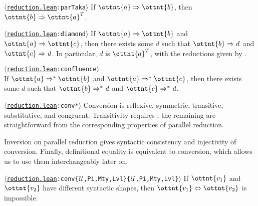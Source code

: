 \documentclass[a4paper,UKenglish,cleveref,autoref,thm-restate]{lipics-v2021}
\newcommand{\repo}{https://github.com/ionathanch/TTBFL}
\newcommand{\thmref}[2]{%
  $\langle$\href{\repo/tree/main/src/#1}{\texttt{#1}}\texttt{:#2}$\rangle$%
}
\begin{document}
\begin{lemma}[Completion (p.r.)] \thmref{reduction.lean}{parTaka} \label{lem:par:compl}
  If $ \ottnt{a}  \Rightarrow  \ottnt{b} $, then $ \ottnt{b}  \Rightarrow   \ottnt{a} ^{ \mathsf{T} }  $.
\end{lemma}

\begin{corollary}[Diamond (p.r.)] \thmref{reduction.lean}{diamond} \label{lem:par:diamond}
  If $ \ottnt{a}  \Rightarrow  \ottnt{b} $ and $ \ottnt{a}  \Rightarrow  \ottnt{c} $,
  then there exists some $d$ such that $ \ottnt{b}  \Rightarrow   \mathit{ d }  $ and $ \ottnt{c}  \Rightarrow   \mathit{ d }  $.
  In particular, $d$ is $ \ottnt{a} ^{ \mathsf{T} } $,
  with the reductions given by .
\end{corollary}

\begin{theorem}[Confluence (p.r.)] \thmref{reduction.lean}{confluence} \label{lem:par:confl} \\
  If $ \ottnt{a}  \Rightarrow^\ast  \ottnt{b} $ and $ \ottnt{a}  \Rightarrow^\ast  \ottnt{c} $,
  then there exists some $d$ such that $ \ottnt{b}  \Rightarrow^\ast   \mathit{ d }  $ and $ \ottnt{c}  \Rightarrow^\ast   \mathit{ d }  $.
\end{theorem}

\begin{corollary} \thmref{reduction.lean}{conv*} \label{lem:conv}
  Conversion is reflexive, symmetric, transitive, substitutive, and congruent.
  Transitivity requires ;
  the remaining are straightforward
  from the corresponding properties of parallel reduction.
\end{corollary}

Inversion on parallel reduction gives syntactic consistency and injectivity of conversion.
Finally, definitional equality is equivalent to conversion,
which allows us to use them interchangeably later on.

\begin{lemma} \thmref{reduction.lean}{conv\{$\mathcal{U}$,Pi,Mty,Lvl\}\{$\mathcal{U}$,Pi,Mty,Lvl\}} \label{lem:par:consistency}
  If $\ottnt{v_{{\mathrm{1}}}}$ and $\ottnt{v_{{\mathrm{2}}}}$ have different syntactic shapes,
  then $ \ottnt{v_{{\mathrm{1}}}}  \Leftrightarrow  \ottnt{v_{{\mathrm{2}}}} $ is impossible.
\end{lemma}
\end{document}
